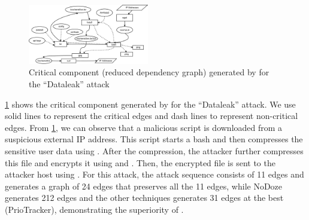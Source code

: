 \begin{figure}[t]
    \centering
    \includegraphics[width=0.47\textwidth]{figs/s&p/dataleak.pdf}
    \caption{Critical component (reduced dependency graph) generated by \tool for the ``Dataleak'' attack}
    \label{fig:dataleak}
\end{figure} 
\cref{fig:dataleak} shows the
critical component generated by \tool for the ``Dataleak'' attack. 
We use solid lines to represent the critical edges and dash lines to represent non-critical edges. 
From \cref{fig:dataleak}, we can observe that a malicious script  is downloaded from a suspicious external IP address. 
This script starts a bash and then compresses the sensitive user data using . 
After the compression, the attacker further compresses this file and encrypts it using  and . 
Then, the encrypted file is sent to the attacker host using . 
For this attack, the attack sequence consists of 11 edges and \tool generates a graph of 24 edges that preserves all the 11 edges, while NoDoze generates 212 edges and the other techniques generates 31 edges at the best (\ie PrioTracker), demonstrating the superiority of \tool.









  